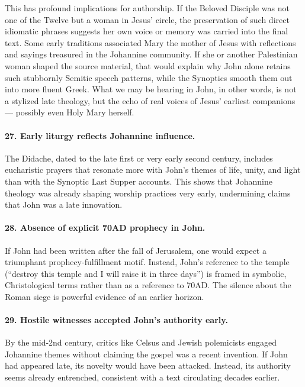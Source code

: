 This has profound implications for authorship.
If the Beloved Disciple was not one of the Twelve but a woman in Jesus’ circle, the preservation of such direct idiomatic phrases suggests her own voice or memory was carried into the final text.
Some early traditions associated Mary the mother of Jesus with reflections and sayings treasured in the Johannine community.
If she or another Palestinian woman shaped the source material, that would explain why John alone retains such stubbornly Semitic speech patterns, while the Synoptics smooth them out into more fluent Greek.
What we may be hearing in John, in other words, is not a stylized late theology, but the echo of real voices of Jesus’ earliest companions — possibly even Holy Mary herself.

\paragraph{27.
Early liturgy reflects Johannine influence.}\label{par:early-liturgy-reflects-johannine-influence.}

The Didache, dated to the late first or very early second century, includes eucharistic prayers that resonate more with John’s themes of life, unity, and light than with the Synoptic Last Supper accounts.
This shows that Johannine theology was already shaping worship practices very early, undermining claims that John was a late innovation.

\paragraph{28.
Absence of explicit 70AD prophecy in John.}\label{par:absence-of-explicit-70ad-prophecy-in-john.}

If John had been written after the fall of Jerusalem, one would expect a triumphant prophecy-fulfillment motif.
Instead, John’s reference to the temple (“destroy this temple and I will raise it in three days”) is framed in symbolic, Christological terms rather than as a reference to 70AD.
The silence about the Roman siege is powerful evidence of an earlier horizon.

\paragraph{29.
Hostile witnesses accepted John’s authority early.}\label{par:hostile-witnesses-accepted-johns-authority-early.}

By the mid-2nd century, critics like Celsus and Jewish polemicists engaged Johannine themes without claiming the gospel was a recent invention.
If John had appeared late, its novelty would have been attacked.
Instead, its authority seems already entrenched, consistent with a text circulating decades earlier.

